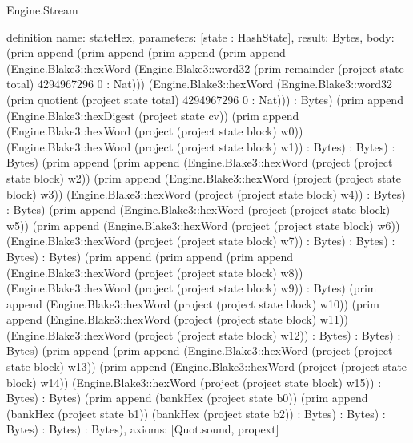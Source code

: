 \begin{lexlean}{Engine.Stream}
\begin{semanticmodule}
definition{
  name: stateHex,
  parameters: [state : HashState],
  result: Bytes,
  body: (prim append (prim append (prim append (prim append (Engine.Blake3::hexWord (Engine.Blake3::word32 (prim remainder (project state total) 4294967296 0 : Nat))) (Engine.Blake3::hexWord (Engine.Blake3::word32 (prim quotient (project state total) 4294967296 0 : Nat))) : Bytes) (prim append (Engine.Blake3::hexDigest (project state cv)) (prim append (Engine.Blake3::hexWord (project (project state block) w0)) (Engine.Blake3::hexWord (project (project state block) w1)) : Bytes) : Bytes) : Bytes) (prim append (prim append (Engine.Blake3::hexWord (project (project state block) w2)) (prim append (Engine.Blake3::hexWord (project (project state block) w3)) (Engine.Blake3::hexWord (project (project state block) w4)) : Bytes) : Bytes) (prim append (Engine.Blake3::hexWord (project (project state block) w5)) (prim append (Engine.Blake3::hexWord (project (project state block) w6)) (Engine.Blake3::hexWord (project (project state block) w7)) : Bytes) : Bytes) : Bytes) : Bytes) (prim append (prim append (prim append (Engine.Blake3::hexWord (project (project state block) w8)) (Engine.Blake3::hexWord (project (project state block) w9)) : Bytes) (prim append (Engine.Blake3::hexWord (project (project state block) w10)) (prim append (Engine.Blake3::hexWord (project (project state block) w11)) (Engine.Blake3::hexWord (project (project state block) w12)) : Bytes) : Bytes) : Bytes) (prim append (prim append (Engine.Blake3::hexWord (project (project state block) w13)) (prim append (Engine.Blake3::hexWord (project (project state block) w14)) (Engine.Blake3::hexWord (project (project state block) w15)) : Bytes) : Bytes) (prim append (bankHex (project state b0)) (prim append (bankHex (project state b1)) (bankHex (project state b2)) : Bytes) : Bytes) : Bytes) : Bytes) : Bytes),
  axioms: [Quot.sound, propext]
}
\end{semanticmodule}
\end{lexlean}
